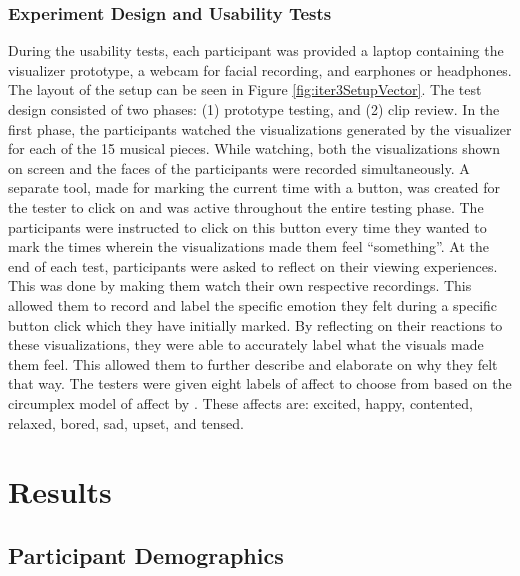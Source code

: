 \documentclass{sigchi-ext}
\begin{document}
\subsubsection{Experiment Design and Usability Tests}
During the usability tests, each participant was provided a laptop containing the visualizer prototype, a webcam for facial recording, and earphones or headphones. The layout of the setup can be seen in Figure \ref{fig:iter3SetupVector}. The test design consisted of two phases: (1) prototype testing, and (2) clip review. In the first phase, the participants watched the visualizations generated by the visualizer for each of the 15 musical pieces. While watching, both the visualizations shown on screen and the faces of the participants were recorded simultaneously. A separate tool, made for marking the current time with a button, was created for the tester to click on and was active throughout the entire testing phase. The participants were instructed to click on this button every time they wanted to mark the times wherein the visualizations made them feel ``something''. At the end of each test, participants were asked to reflect on their viewing experiences. This was done by making them watch their own respective recordings. This allowed them to record and label the specific emotion they felt during a specific button click which they have initially marked. By reflecting on their reactions to these visualizations, they were able to accurately label what the visuals made them feel. This allowed them to further describe and elaborate on why they felt that way. The testers were given eight labels of affect to choose from based on the circumplex model of affect by \cite{Russel:1980}. These affects are: excited, happy, contented, relaxed, bored, sad, upset, and tensed.













\section{Results}
\subsection{Participant Demographics}
\end{document}
